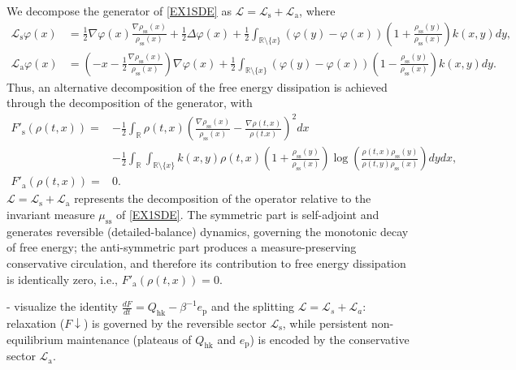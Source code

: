 \documentclass[10pt]{article}
\theoremstyle{definition}
\numberwithin{equation}{section}
\begin{document}
We decompose the generator of \eqref{EX1SDE} as $\mathcal{L}=\mathcal{L}_\mathrm{s}+\mathcal{L}_\mathrm{a}$, where
\begin{align*}
    \mathcal{L}_\mathrm{s}\varphi(x)
    &= \frac{1}{2}\nabla\varphi(x)\frac{\nabla\rho_\mathrm{ss}(x)}{\rho_\mathrm{ss}(x)} + \frac{1}{2}\Delta\varphi(x) + \frac{1}{2}\int_{\mathbb{R} \setminus \{x\}}(\varphi(y)-\varphi(x))\left( 1 + \frac{\rho_\mathrm{ss}(y)}{\rho_\mathrm{ss}(x)} \right)k(x,y)dy,\\
    \mathcal{L}_\mathrm{a}\varphi(x)
    &= \left( -x - \frac{1}{2}\frac{\nabla\rho_\mathrm{ss}(x)}{\rho_\mathrm{ss}(x)} \right)\nabla\varphi(x) + \frac{1}{2}\int_{\mathbb{R} \setminus \{x\}}(\varphi(y)-\varphi(x))\left( 1 - \frac{\rho_\mathrm{ss}(y)}{\rho_\mathrm{ss}(x)} \right)k(x,y)dy.
\end{align*}
Thus, an alternative decomposition of the free energy dissipation is achieved through the decomposition of the generator, with
\begin{align*}
    F'_\mathrm{s}(\rho(t,x))
    =& -\frac{1}{2}\int_{\mathbb{R}}\rho(t,x)\left(\frac{\nabla\rho_\mathrm{ss}(x)}{\rho_\mathrm{ss}(x)} - \frac{\nabla\rho(t,x)}{\rho(t.x)}\right)^2dx\\
    &- \frac{1}{2}\int_{\mathbb{R}}\int_{\mathbb{R} \setminus \{x\}} k(x,y)\rho(t,x)\left( 1 + \frac{\rho_\mathrm{ss}(y)}{\rho_\mathrm{ss}(x)} \right)\log\left(\frac{\rho(t,x)\rho_\mathrm{ss}(y)}{\rho(t,y)\rho_\mathrm{ss}(x)}\right) dydx,\\
    F'_\mathrm{a}(\rho(t,x))
    =& 0.
\end{align*}
$\mathcal{L}=\mathcal{L}_\mathrm{s}+\mathcal{L}_\mathrm{a}$ represents the decomposition of the operator relative to the invariant measure $\mu_\mathrm{ss}$ of \eqref{EX1SDE}. The symmetric part is self-adjoint and generates reversible (detailed-balance) dynamics, governing the monotonic decay of free energy; the anti-symmetric part produces a measure-preserving conservative circulation, and therefore its contribution to free energy dissipation is identically zero, i.e., $F'_\mathrm{a}(\rho(t,x)) = 0$.

 -  visualize the identity $\frac{dF}{dt}=Q_\mathrm{hk}-\beta^{-1}e_\mathrm{p}$ and the splitting $\mathcal{L}=\mathcal{L}_s+\mathcal{L}_a$: relaxation ($F\downarrow$) is governed by the reversible sector $\mathcal{L}_\mathrm{s}$, while persistent non-equilibrium maintenance (plateaus of $Q_\mathrm{hk}$ and $e_\mathrm{p}$) is encoded by the conservative sector $\mathcal{L}_\mathrm{a}$.
\end{document}
